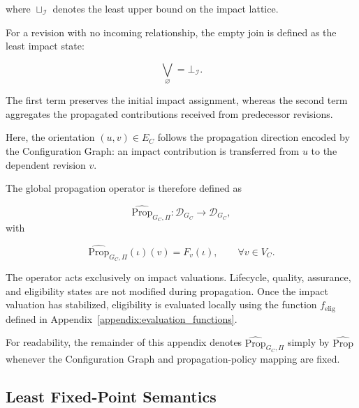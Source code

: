 \documentclass[10pt]{article}
\begin{document}
where $\sqcup_{\mathcal I}$ denotes the least upper bound on the impact lattice.

For a revision with no incoming relationship, the empty join is defined as the least impact state:

\begin{equation}
	\bigvee_{\varnothing}
	=
	\bot_{\mathcal I}.
	\label{eq:empty_impact_join}
\end{equation}

The first term preserves the initial impact assignment, whereas the second term
aggregates the propagated contributions received from predecessor revisions.

Here, the orientation $(u,v)\in E_C$ follows the propagation direction encoded
by the Configuration Graph: an impact contribution is transferred from $u$ to
the dependent revision $v$.


The global propagation operator is therefore defined as

\begin{equation}
	\label{eq:impact_operator}
	\widehat{\mathrm{Prop}}_{G_C,\Pi}
	:
	\mathcal D_{G_C}
	\rightarrow
	\mathcal D_{G_C},
\end{equation}
with

\begin{equation}
	\label{eq:impact_operator_definition}
	\widehat{\mathrm{Prop}}_{G_C,\Pi}(\iota)(v)
	=
	F_v(\iota),
	\qquad
	\forall v\in V_C.
\end{equation}

The operator acts exclusively on impact valuations.
Lifecycle, quality, assurance, and eligibility states are not modified during propagation. Once the impact valuation has stabilized, eligibility is evaluated locally using the function
$f_{\mathrm{elig}}$ defined in Appendix~\ref{appendix:evaluation_functions}.

For readability, the remainder of this appendix denotes
$\widehat{\mathrm{Prop}}_{G_C,\Pi}$ simply by $\widehat{\mathrm{Prop}}$ whenever the Configuration Graph and
propagation-policy mapping are fixed.

\subsection{Least Fixed-Point Semantics}
\end{document}
